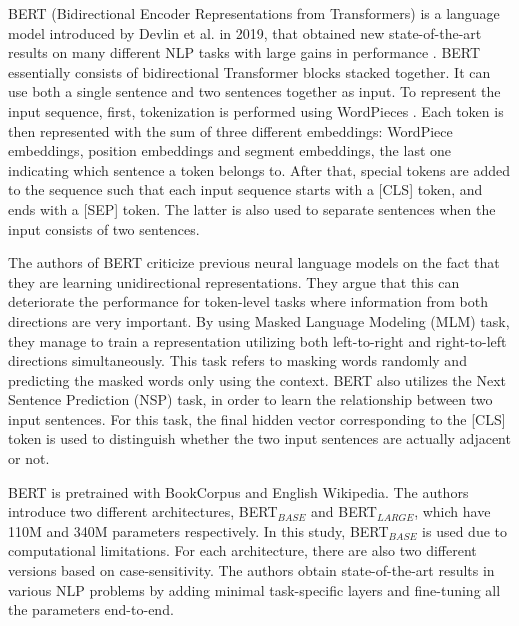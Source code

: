 \documentclass{report}
\theoremstyle{definition}
\theoremstyle{remark}
\begin{document}
BERT (Bidirectional Encoder Representations from
Transformers) is a language model introduced by Devlin et al. in 2019, that obtained new state-of-the-art results on many different NLP tasks with large gains in performance \cite{BERT}. BERT essentially consists of bidirectional Transformer \cite{transformer} blocks stacked together. It can use both a single sentence and two sentences together as input. To represent the input sequence, first, tokenization is performed using WordPieces \cite{wordpiece}. Each token is then represented with the sum of three different embeddings: WordPiece embeddings, position embeddings and segment embeddings, the last one indicating which sentence a token belongs to. After that, special tokens are added to the sequence such that each input sequence starts with a [CLS] token, and ends with a [SEP] token. The latter is also used to separate sentences when the input consists of two sentences. 

The authors of BERT criticize previous neural language models on the fact that they are learning unidirectional representations. They argue that this can deteriorate the performance for token-level tasks where information from both directions are very important. By using Masked Language Modeling (MLM) task, they manage to train a representation utilizing both left-to-right and right-to-left directions simultaneously. This task refers to masking words randomly and predicting the masked words only using the context. BERT also utilizes the Next Sentence Prediction (NSP) task, in order to learn the relationship between two input sentences. For this task, the final hidden vector corresponding to the [CLS] token is used to distinguish whether the two input sentences are actually adjacent or not.

BERT is pretrained with BookCorpus \cite{bookscorpus} and English Wikipedia. The authors introduce two different architectures, BERT$_{BASE}$ and BERT$_{LARGE}$, which have 110M and 340M parameters respectively. In this study, BERT$_{BASE}$ is used due to computational limitations. For each architecture, there are also two different versions based on case-sensitivity. The authors obtain state-of-the-art results in various NLP problems by adding minimal task-specific layers and fine-tuning all the parameters end-to-end.
\end{document}
